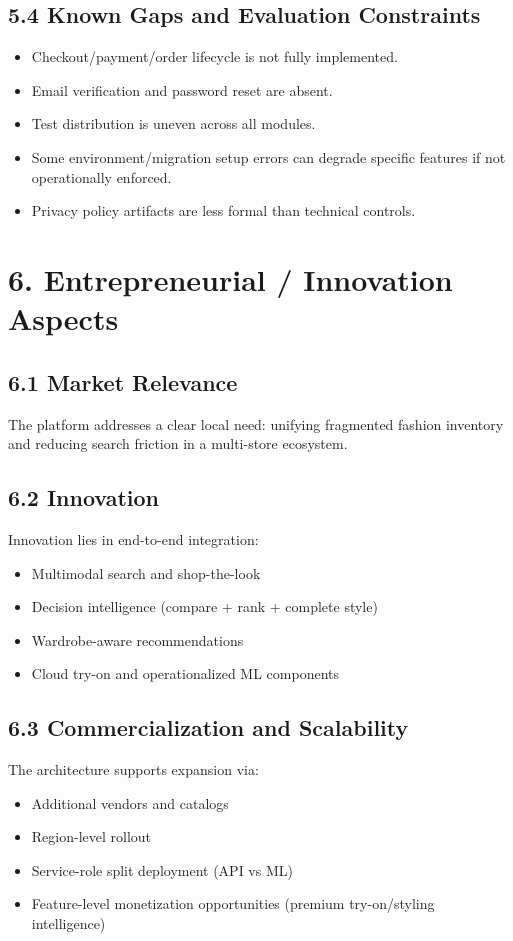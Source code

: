 \documentclass[12pt,a4paper]{report}
\begin{document}
\section{5.4 Known Gaps and Evaluation Constraints}
\begin{itemize}
\item Checkout/payment/order lifecycle is not fully implemented.
\item Email verification and password reset are absent.
\item Test distribution is uneven across all modules.
\item Some environment/migration setup errors can degrade specific features if not operationally enforced.
\item Privacy policy artifacts are less formal than technical controls.
\end{itemize}

\chapter{6. Entrepreneurial / Innovation Aspects}
\section{6.1 Market Relevance}
The platform addresses a clear local need: unifying fragmented fashion inventory and reducing search friction in a multi-store ecosystem.


\section{6.2 Innovation}
Innovation lies in end-to-end integration:

\begin{itemize}
\item Multimodal search and shop-the-look
\item Decision intelligence (compare + rank + complete style)
\item Wardrobe-aware recommendations
\item Cloud try-on and operationalized ML components
\end{itemize}

\section{6.3 Commercialization and Scalability}
The architecture supports expansion via:

\begin{itemize}
\item Additional vendors and catalogs
\item Region-level rollout
\item Service-role split deployment (API vs ML)
\item Feature-level monetization opportunities (premium try-on/styling intelligence)
\end{itemize}
\end{document}
